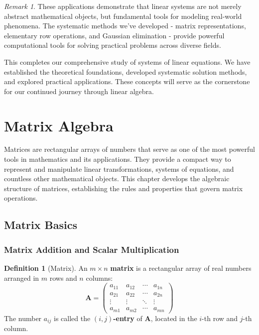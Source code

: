 \documentclass[12pt]{article}
\numberwithin{equation}{section}
\newcommand{\mat}[1]{\mathbf{#1}}        %
\theoremstyle{plain}
\theoremstyle{definition}
\newtheorem{definition}[theorem]{Definition}
\theoremstyle{remark}
\newtheorem{remark}[theorem]{Remark}
\begin{document}
\begin{remark}
These applications demonstrate that linear systems are not merely abstract mathematical objects, but fundamental tools for modeling real-world phenomena. The systematic methods we've developed - matrix representations, elementary row operations, and Gaussian elimination - provide powerful computational tools for solving practical problems across diverse fields.
\end{remark}

This completes our comprehensive study of systems of linear equations. We have established the theoretical foundations, developed systematic solution methods, and explored practical applications. These concepts will serve as the cornerstone for our continued journey through linear algebra.

\newpage
\section{Matrix Algebra}

Matrices are rectangular arrays of numbers that serve as one of the most powerful tools in mathematics and its applications. They provide a compact way to represent and manipulate linear transformations, systems of equations, and countless other mathematical objects. This chapter develops the algebraic structure of matrices, establishing the rules and properties that govern matrix operations.

\subsection{Matrix Basics}

\subsubsection{Matrix Addition and Scalar Multiplication}

\begin{definition}[Matrix]
An $m \times n$ \textbf{matrix} is a rectangular array of real numbers arranged in $m$ rows and $n$ columns:
$$\mat{A} = \begin{pmatrix}
a_{11} & a_{12} & \cdots & a_{1n}\\
a_{21} & a_{22} & \cdots & a_{2n}\\
\vdots & \vdots & \ddots & \vdots\\
a_{m1} & a_{m2} & \cdots & a_{mn}
\end{pmatrix}$$
The number $a_{ij}$ is called the \textbf{$(i,j)$-entry} of $\mat{A}$, located in the $i$-th row and $j$-th column.
\end{definition}
\end{document}
